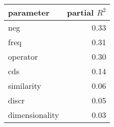 \begin{tabular}{lr}
\toprule
      parameter &  partial $R^2$ \\
\midrule
            neg &  0.33 \\
           freq &  0.31 \\
       operator &  0.30 \\
            cds &  0.14 \\
     similarity &  0.06 \\
          discr &  0.05 \\
 dimensionality &  0.03 \\
\bottomrule
\end{tabular}
